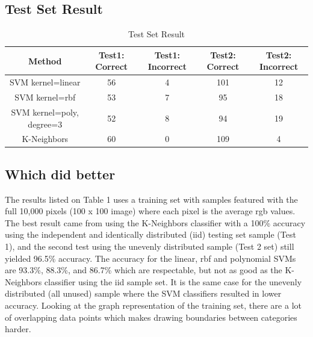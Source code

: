 \documentclass{article}
\begin{document}
    \subsection{Test Set Result}
   \begin{table}[h]
  	\centering
  	\caption{Test Set Result}
  	\label{tab:table1}
  	\begin{tabular}{|c|c|c|c|c|}
  	\hline
  	Method & Test1: Correct & Test1: Incorrect & Test2: Correct & Test2: Incorrect \\
  	\hline
  	SVM kernel=linear & 56 & 4 & 101 & 12 \\
  	\hline
  	SVM kernel=rbf & 53 & 7 & 95 & 18 \\
  	\hline
  	SVM kernel=poly, degree=3 & 52 & 8 & 94 & 19 \\
  	\hline
  	K-Neighbors & 60 & 0 & 109 & 4 \\
  	\hline
  \end{tabular}
  \end{table}
  
  \subsection{Which did better}
  The results listed on Table 1 uses a training set with samples featured with the full 10,000 pixels (100 x 100 image) where each pixel is the average rgb values. The best result came from using the K-Neighbors classifier with a 100\% accuracy using the independent and identically distributed (iid) testing set sample (Test 1), and the second test using the unevenly distributed sample (Test 2 set) still yielded 96.5\% accuracy. The accuracy for the linear, rbf and polynomial SVMs are 93.3\%, 88.3\%, and 86.7\% which are respectable, but not as good as the K-Neighbors classifier using the iid sample set. It is the same case for the unevenly distributed (all unused) sample where the SVM classifiers resulted in lower accuracy. Looking at the graph representation of the training set, there are a lot of overlapping data points which makes drawing boundaries between categories harder.\\
 
\end{document}
